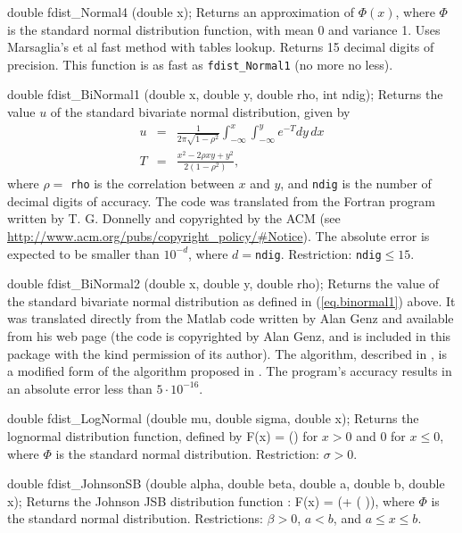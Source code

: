 double fdist_Normal4 (double x);
\endcode
  \tab
  Returns an approximation of $\Phi(x)$,  where $\Phi$ is the standard
  normal distribution function, with mean 0 and variance 1.
   Uses Marsaglia's et al \cite{rMAR94b} fast method
  with tables lookup. Returns 15 decimal digits of precision.
  This function is as fast as {\tt fdist\_Normal1} (no more no less).
 \endtab
\code


double fdist_BiNormal1 (double x, double y, double rho, int ndig);
\endcode
  \tab
  Returns the value $u$ of the standard bivariate normal distribution,
  given by
\begin{eqnarray}
     u &=&  \frac{1}{2\pi\sqrt{1 - \rho^2}} \int_{-\infty}^x
              \int_{-\infty}^y e^{-T} dy\, dx  \label{eq.binormal1} \\[5pt]
     T &=& \frac{x^2 -2\rho x y + y^2}{2(1-\rho^2)}, \nonumber
\end{eqnarray}
  where $\rho = ${ \tt rho} is the correlation between $x$ and $y$, and
 \texttt{ndig} is the number of decimal digits of accuracy.
  The code was translated from the Fortran program written
   by T. G. Donnelly \cite{tDON73a} and copyrighted by the ACM (see
  \url{http://www.acm.org/pubs/copyright_policy/#Notice}). The absolute error
  is expected to be smaller than $10^{-d}$, where $d={}$\texttt{ndig}.
  Restriction: \texttt{ndig}${} \le 15$.
 \endtab
\code


double fdist_BiNormal2 (double x, double y, double rho);
\endcode
  \tab
  Returns the value of the standard bivariate normal distribution as
  defined in (\ref{eq.binormal1}) above.
  It was translated directly from the Matlab code written by Alan Genz
  and available from his web page (the code is copyrighted by Alan Genz,
  and is included in this package with the kind permission of its author).
  The algorithm, described in \cite{tGEN04a}, is a modified form of the
  algorithm proposed in \cite{tDRE89a}. The program's accuracy results
  in an absolute error less than $5 \cdot 10^{-16}$.
 \endtab
\code


double fdist_LogNormal (double mu, double sigma, double x);
\endcode
  \tab
  Returns the lognormal distribution function, defined by \cite{tJOH95a}
  \eq
     F(x) = \Phi \left(\right)
  \endeq
  for $x>0$ and 0 for $x\le 0$,
  where $\Phi$ is the standard normal distribution.
  Restriction: $\sigma > 0$.
 \endtab
\code


double fdist_JohnsonSB (double alpha, double beta, double a, double b,
                        double x);
\endcode
  \tab
  Returns the Johnson JSB distribution function \cite{sLAW00a}:
 \eq
   F(x) = \Phi\left(\alpha + \beta\ln\left( \right)\right),
 \endeq
  where $\Phi$ is the standard normal distribution.
  Restrictions: $\beta>0$, $a < b$, and $a \le x \le b$.
 \endtab
\code


